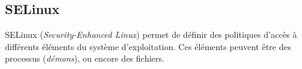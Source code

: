 \subsection{SELinux}
\label{subsec:selinux}

SELinux (\emph{Security-Enhanced Linux}) permet de définir des politiques
d'accès à différents éléments du système d'exploitation. Ces éléments peuvent
être des processus (\emph{démons}), ou encore des fichiers.



